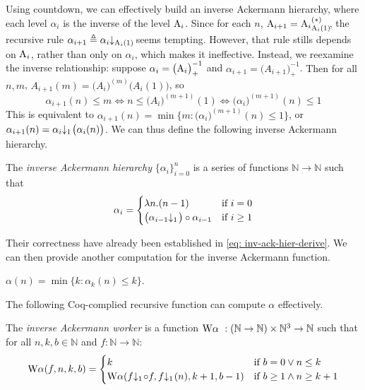Using countdown, we can effectively build an inverse Ackermann hierarchy, where each level $\alpha_i$ is the inverse of the level $\text{A}_i$. Since for each $n$, $\Ack_{i+1} = \rf{\Ack_i}{\Ack_i(1)}$, the recursive rule $\alpha_{i+1} \triangleq \cdt{\alpha_i}{\Ack_i(1)}$ seems tempting. However, that rule stills depends on $\text{A}_i$, rather than only on $\alpha_i$, which makes it ineffective. Instead, we reexamine the inverse relationship: suppose $\alpha_i = \big(\text{A}_i\big)^{-1}_+$ and $\alpha_{i+1} = \big(A_{i+1}\big)^{-1}_+$. {\color{magenta}Then for all $n, m$}, $A_{i+1}(m) = \big(A_i\big)^{(m)}\big(A_i(1)\big)$, so
\begin{equation} \label{eq: inv-ack-hier-derive}
\alpha_{i+1}(n)\le m \iff n\le \big(A_i\big)^{(m+1)}(1) \iff \big(\alpha_i\big)^{(m+1)}(n) \le 1
\end{equation}
This is equivalent to $\alpha_{i+1}(n) = \min\big\{m : \big( \alpha_i \big)^{(m+1)}(n)\le 1\big\}$, or $\alpha_{i+1}(n) = \cdt{\alpha_i}{1}\big(\alpha_i(n)\big)$. We can thus define the following inverse Ackermann hierarchy.
\begin{defn} \label{defn: inv-ack-hier}
	The \emph{inverse Ackermann hierarchy} $\{\alpha_i\}_{i=0}^{n}$ is a series of functions $\mathbb{N}\to \mathbb{N}$ such that
\begin{equation*}
	\alpha_i = \begin{cases}
	\lambda n.(n - 1) & \text{if } i = 0
	\\ \big(\cdt{\alpha_{i-1}}{1}\big)\circ \alpha_{i-1} & \text{if } i\ge 1 \end{cases}
\end{equation*}
\end{defn}
Their correctness have already been established in \eqref{eq: inv-ack-hier-derive}. We can then provide another computation for the inverse Ackermann function.
\begin{thm} \label{thm: inv-ack-hier-correct}
	$\alpha(n) = \min\big\{k : \alpha_k(n)\le k \big\}$.
\end{thm}
The following Coq-complied recursive function can compute $\alpha$ effectively.
\begin{defn} \label{defn: inv-ack-worker}
	The \emph{inverse Ackermann worker} is a function $\text{W}\alpha\ : (\mathbb{N}\to \mathbb{N}) \times \mathbb{N}^3\to \mathbb{N}$ such that for all $n, k, b\in \mathbb{N}$ and $f:\mathbb{N}\to \mathbb{N}$:
	\begin{equation} \label{eq: inv-ack-worker-recursion}
	\W\alpha(f, n, k, b) = \begin{cases}
	k & \text{if } b = 0 \vee n\le k \\ \W\alpha(\cdt{f}{1}\circ f , \cdt{f}{1}(n), k+1, b-1) & \text{if } b \ge 1 \wedge n \ge k+1
	\end{cases}
	\end{equation}
\end{defn}
